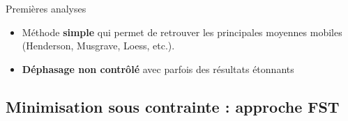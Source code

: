 \documentclass[10pt,xcolor=table,color={dvipsnames,usenames},ignorenonframetext,usepdftitle=false,french]{beamer}
\providecommand{\tightlist}{%
  \setlength{\parskip}{0pt}
  }
\newcommand\1{\mathds{1}}
\begin{document}
\begin{frame}{Premières analyses}
\protect\hypertarget{premiuxe8res-analyses}{}
\begin{summary}

\begin{itemize}
\tightlist
\item
  \bcsmbh{} Méthode \textbf{simple} qui permet de retrouver les
  principales moyennes mobiles (Henderson, Musgrave, Loess, etc.).
\end{itemize}

\pause

\begin{itemize}
\tightlist
\item
  \bcsmmh{} \textbf{Déphasage non contrôlé} avec parfois des résultats
  étonnants\\
\end{itemize}

\end{summary}

\end{frame}

\hypertarget{minimisation-sous-contrainte-approche-fst}{%
\subsection{Minimisation sous contrainte : approche
FST}\label{minimisation-sous-contrainte-approche-fst}}
\end{document}
